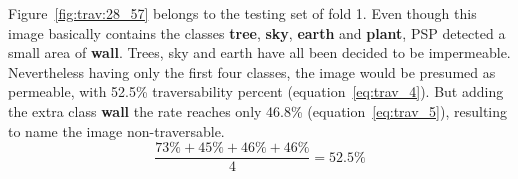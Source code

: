 \documentclass[12pt,a4paper,table,dvipsnames,tikz]{report}
\newcommand{\acronym}{\MakeUppercase}
\newcommand{\bl}[1]{{\hypersetup{linkcolor=blue}#1}}
\newcommand{\class}[1]{\textbf{\textcolor{#1}{#1}}} %
\begin{document}
	Figure~\bl{\ref{fig:trav:28_57}} belongs to the testing set of fold 1. Even though 
	this image basically contains the classes \class{tree}, \class{sky}, \class{earth} 
	and \class{plant}, \acronym{psp} detected a small area of \class{wall}. Trees, sky 
	and earth have all been decided to be impermeable. Nevertheless having only the first 
	four classes, the image would be presumed as permeable, with 52.5\% traversability 
	percent (equation~\bl{\ref{eq:trav_4}}). But adding the extra class \class{wall} the 
	rate reaches only 46.8\% (equation~\bl{\ref{eq:trav_5}}), resulting to name the image 
	non-traversable.
	\begin{equation} \label{eq:trav_4}
	\frac{73\% + 45\% + 46\% + 46\%}{4} = 52.5\%
	\end{equation}
	
	
	
\end{document}
